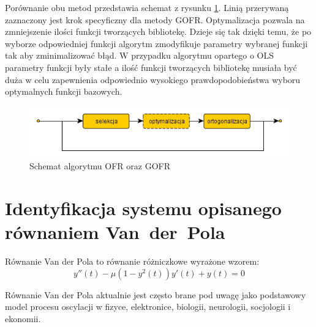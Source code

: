 Porównanie obu metod przedstawia schemat z rysunku \ref{ofr_and_gofr}. Linią przerywaną zaznaczony jest krok specyficzny dla metody GOFR. Optymalizacja pozwala na zmniejszenie ilości funkcji tworzących bibliotekę. Dzieje się tak dzięki temu, że po wyborze odpowiedniej funkcji algorytm zmodyfikuje parametry wybranej funkcji tak aby zminimalizować błąd. W przypadku algorytmu opartego o OLS parametry funkcji były stałe a ilość funkcji tworzących bibliotekę musiała być duża w celu zapewnienia odpowiednio wysokiego prawdopodobieństwa wyboru optymalnych funkcji bazowych.

\begin{figure}[ht!]
	\centering
	
	\includegraphics[scale=0.7]{images/ofr_and_gofr.png}
	\caption{Schemat algorytmu OFR oraz GOFR}
	\label{ofr_and_gofr}	

\end{figure}

\clearpage
\section{Identyfikacja systemu opisanego równaniem \mbox{Van der Pola}}

Równanie Van der Pola to równanie różniczkowe wyrażone wzorem:
\begin{equation}
	\label{wzor:van_der_pol}
	y''(t) - \mu(1 - y^2(t))y'(t) + y(t) = 0
\end{equation}

Równanie Van der Pola aktualnie jest często brane pod uwagę jako podstawowy model procesu oscylacji w fizyce, elektronice, biologii, neurologii, socjologii i ekonomii\cite{Tsatsos}.

